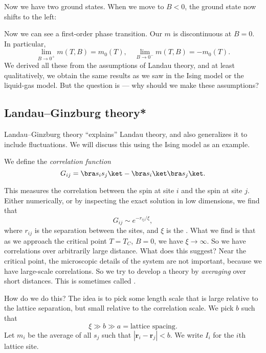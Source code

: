 \documentclass[a4paper]{article}
\begin{document}
Now we have two ground states. When we move to $B < 0$, the ground state now shifts to the left:
\begin{center}
\end{center}
Now we can see a first-order phase transition. Our $m$ is discontinuous at $B = 0$. In particular,
\[
  \lim_{B \to 0^+} m(T, B) = m_0(T),\quad \lim_{B \to 0^-} m(T, B) = -m_0(T).
\]
We derived all these from the assumptions of Landau theory, and at least qualitatively, we obtain the same results as we saw in the Ising model or the liquid-gas model. But the question is --- why should we make these assumptions?

\subsection{Landau--Ginzburg theory*}
Landau--Ginzburg theory ``explains'' Landau theory, and also generalizes it to include fluctuations. We will discuss this using the Ising model as an example.

\begin{defi}
  We define the \emph{correlation function}
  \[
    G_{ij} = \bra s_i s_j\ket - \bra s_i \ket\bra s_j\ket.
  \]
\end{defi}
This measures the correlation between the spin at site $i$ and the spin at site $j$. Either numerically, or by inspecting the exact solution in low dimensions, we find that
\[
  G_{ij} \sim e^{-r_{ij}/\xi},
\]
where $r_{ij}$ is the separation between the sites, and $\xi$ is the . What we find is that as we approach the critical point $T = T_C$, $B = 0$, we have $\xi \to \infty$. So we have correlations over arbitrarily large distance. What does this suggest? Near the critical point, the microscopic details of the system are not important, because we have large-scale correlations. So we try to develop a theory by \emph{averaging} over short distances. This is sometimes called .

How do we do this? The idea is to pick some length scale that is large relative to the lattice separation, but small relative to the correlation scale. We pick $b$ such that
\[
  \xi \gg b \gg a = \text{lattice spacing}.
\]
Let $m_i$ be the average of all $s_j$ such that $|\mathbf{r}_i - \mathbf{r}_j| < b$. We write $I_i$ for the $i$th lattice site.
\end{document}
